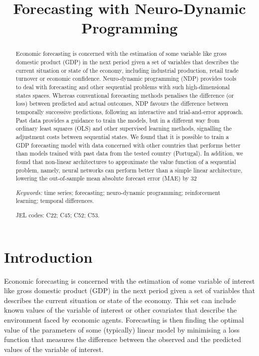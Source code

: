 
\title{Forecasting with Neuro-Dynamic Programming}
\maketitle



\begin{abstract}

Economic forecasting is concerned with the estimation of some variable like gross domestic product (GDP) in the next period given a set of variables that describes the current situation or state of the economy, including industrial production, retail trade turnover or economic confidence. Neuro-dynamic programming (NDP) provides tools to deal with forecasting and other sequential problems with such high-dimensional states spaces. Whereas conventional forecasting methods penalises the difference (or loss) between predicted and actual outcomes, NDP favours the difference between temporally successive predictions, following an interactive and trial-and-error approach. Past data provides a guidance to train the models, but in a different way from ordinary least squares (OLS) and other supervised learning methods, signalling the adjustment costs between sequential states. We found that it is possible to train a GDP forecasting model with data concerned with other countries that performs better than models trained with past data from the tested country (Portugal). In addition, we found that non-linear architectures to approximate the value function of a sequential problem, namely, neural networks can perform better than a simple linear architecture, lowering the out-of-sample mean absolute forecast error (MAE) by 32\

\noindent \emph{Keywords:} time series; forecasting; neuro-dynamic programming; reinforcement learning; temporal differences.

\noindent JEL codes: C22; C45; C52; C53.

\end{abstract}

\pagebreak



\pagebreak


\section{Introduction}
\label{sec:intro}

Economic forecasting is concerned with the estimation of some variable of interest like gross domestic product (GDP) in the next period given a set of variables that describes the current situation or state of the economy. This set can include known values of the variable of interest or other covariates that describe the environment faced by economic agents. Forecasting is then finding the optimal value of the parameters of some (typically) linear model by minimising a loss function that measures the difference between the observed and the predicted values of the variable of interest.

